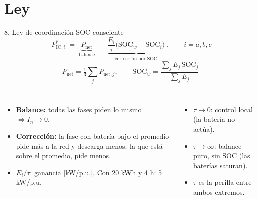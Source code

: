 \documentclass[aspectratio=169,11pt]{beamer}
\newcommand{\Picr}[1]{P^{*}_{\mathrm{IC},#1}}
\newcommand{\Pnet}[1]{P_{\mathrm{net},#1}}
\newcommand{\Pnetm}{\bar P_{\mathrm{net}}}
\newcommand{\SOC}[1]{\mathrm{SOC}_{#1}}
\newcommand{\SOCw}{\overline{\mathrm{SOC}}_{w}}
\begin{document}
\section{Ley}
\begin{frame}{8. Ley de coordinación SOC-consciente}
  \begin{equation}
    \boxed{\;\Picr{i} \;=\; \underbrace{\Pnetm}_{\text{balance}} \;+\; \underbrace{\frac{E_i}{\tau}\big(\SOCw-\SOC{i}\big)}_{\text{corrección por SOC}}\;},\qquad i=a,b,c
  \end{equation}
  \vspace{-4pt}
  \[
    \Pnetm=\tfrac13\textstyle\sum_j \Pnet{j},\qquad
    \SOCw=\dfrac{\sum_j E_j\,\SOC{j}}{\sum_j E_j}
  \]
  \begin{columns}[T]
    \begin{itemize}\footnotesize
      \item \textbf{Balance:} todas las fases piden lo mismo $\Rightarrow I_n\to0$.
      \item \textbf{Corrección:} la fase con batería bajo el promedio pide más a la red y descarga menos; la que está sobre el promedio, pide menos.
      \item $E_i/\tau$: ganancia [kW/p.u.]. Con 20 kWh y 4 h: 5 kW/p.u.
    \end{itemize}
    \begin{itemize}\footnotesize
      \item $\tau\to0$: control local (la batería no actúa).
      \item $\tau\to\infty$: balance puro, sin SOC (las baterías saturan).
      \item $\tau$ es la perilla entre ambos extremos.
    \end{itemize}
  \end{columns}
\end{frame}
\end{document}
